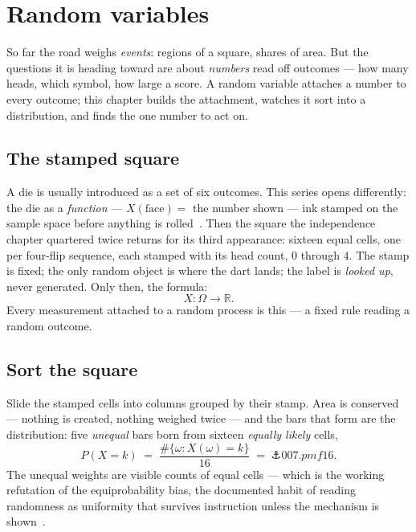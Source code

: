 \chapter{Random variables}

\begin{narrative}
So far the road weighs \emph{events}: regions of a square, shares of
area. But the questions it is heading toward are about \emph{numbers}
read off outcomes — how many heads, which symbol, how large a score. A
random variable attaches a number to every outcome; this chapter builds
the attachment, watches it sort into a distribution, and finds the one
number to act on.

\section{The stamped square}

A die is usually introduced as a set of six outcomes. This series
opens differently: the die as a \emph{function} — $X(\text{face}) =$
the number shown — ink stamped on the sample space before anything is
rolled~\cite{probability-joe-blitzstein-stat-110}. Then the square the
independence chapter quartered twice returns for its third appearance:
sixteen equal cells, one per four-flip sequence, each stamped with its
head count, $0$ through $4$. The stamp is fixed; the only random
object is where the dart lands; the label is \emph{looked up}, never
generated. Only then, the formula:
\[
  X : \Omega \to \mathbb{R} .
\]
Every measurement attached to a random process is this — a fixed rule
reading a random outcome.

\section{Sort the square}

Slide the stamped cells into columns grouped by their stamp. Area is
conserved — nothing is created, nothing weighed twice — and the bars
that form are the distribution: five \emph{unequal} bars born from
sixteen \emph{equally likely} cells,
\[
  P(X = k) \;=\; \frac{\#\{\omega : X(\omega) = k\}}{16}
  \;=\; \anchor{007.pmf16} .
\]
The unequal weights are visible counts of equal cells — which is the
working refutation of the equiprobability bias, the documented habit
of reading randomness as uniformity that survives instruction
unless the mechanism is
shown~\cite{probability-gauvrit-morsanyi-the-equiprobability-bias-pmc}.


\end{narrative}
